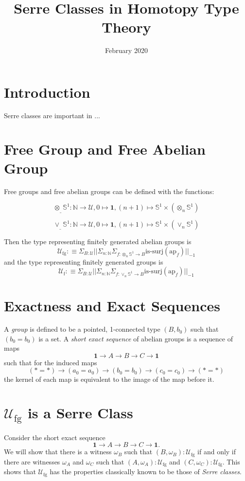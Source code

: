 \documentclass{article}
\title{Serre Classes in Homotopy Type Theory}
\date{February 2020}
\newcommand{\n}{\mathbb{N}}
\newcommand{\Univ}{\mathcal{U}}
\newcommand{\Univfg}{\mathcal{U}_{\textrm{fg}}}
\newcommand{\Univf}{\mathcal{U}_{\textrm{f}}}
\newcommand{\0}{\mathbf{0}}
\newcommand{\1}{\mathbf{1}}
\newcommand{\defequiv}{: \equiv}
\newcommand{\sone}{\mathbb{S}^1}
\newcommand{\ap}[1]{\textrm{ap}_{#1}}
\newcommand{\TODO}[1]{\marginpar{\textcolor{blue}{#1}}}
\begin{document}
\maketitle

\section{Introduction}
Serre classes are important in ... 

\section{Free Group and Free Abelian Group}

Free groups and free abelian groups can be defined with the functions:

$$ \otimes_\_ \sone : \n \to \Univ, 0 \mapsto \1, (n+1) \mapsto \sone \times (\otimes_n \sone) $$


$$ \vee_\_ \sone : \n \to \Univ, 0 \mapsto \1, (n+1) \mapsto \sone \times (\vee_n \sone) $$

Then the type representing finitely generated abelian groups is 
$$ \Univfg \defequiv \Sigma_{B : \Univ} || \Sigma_{n : \n} \Sigma_{f : \otimes_n \sone \to B} \textrm{is-surj}(\ap{f}) ||_{-1} $$
and the type representing finitely generated groups is 
$$ \Univf \defequiv \Sigma_{B : \Univ} || \Sigma_{n : \n} \Sigma_{f : \vee_n \sone \to B} \textrm{is-surj}(\ap{f}) ||_{-1} $$

\section{Exactness and Exact Sequences}
A \textit{group} is defined to be a pointed, 1-connected type $(B,b_0)$ such that $(b_0 = b_0)$ is a set. A \textit{short exact sequence} of abelian \TODO{Does it make sense to take out ``abelian''?} groups is a sequence of maps $$ \1 \to A \to B \to C \to \1 $$ such that for the induced maps $$ (* = *) \to (a_0 = a_0) \to (b_0 = b_0) \to (c_0 = c_0) \to (* = *)$$ the kernel of each map is equivalent to the image of the map before it.

\section{$\Univfg$ is a Serre Class}
Consider the short exact sequence $$ \1 \to A \to B \to C \to \1.$$ We will show that there is a witness $\omega_B$ such that $(B, \omega_B) : \Univfg$ if and only if there are witnesses $\omega_A$ and $\omega_C$ such that $(A, \omega_A) : \Univfg$ and $(C, \omega_C) : \Univfg$. This shows that $\Univfg$ has the properties classically known to be those of \textit{Serre classes}.
\end{document}
